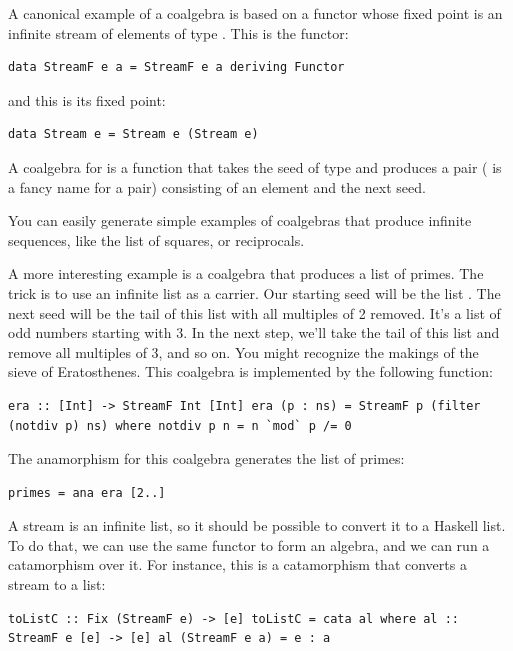 A canonical example of a coalgebra is based on a functor whose fixed
point is an infinite stream of elements of type . This is the
functor:

\begin{verbatim}
data StreamF e a = StreamF e a deriving Functor
\end{verbatim}

and this is its fixed point:

\begin{verbatim}
data Stream e = Stream e (Stream e)
\end{verbatim}

A coalgebra for  is a function that takes the seed of
type  and produces a pair ( is a fancy name
for a pair) consisting of an element and the next seed.

You can easily generate simple examples of coalgebras that produce
infinite sequences, like the list of squares, or reciprocals.

A more interesting example is a coalgebra that produces a list of
primes. The trick is to use an infinite list as a carrier. Our starting
seed will be the list \code{{[}2..{]}}. The next seed will be the tail
of this list with all multiples of 2 removed. It's a list of odd numbers
starting with 3. In the next step, we'll take the tail of this list and
remove all multiples of 3, and so on. You might recognize the makings of
the sieve of Eratosthenes. This coalgebra is implemented by the
following function:

\begin{verbatim}
era :: [Int] -> StreamF Int [Int] era (p : ns) = StreamF p (filter (notdiv p) ns) where notdiv p n = n `mod` p /= 0
\end{verbatim}

The anamorphism for this coalgebra generates the list of primes:

\begin{verbatim}
primes = ana era [2..]
\end{verbatim}

A stream is an infinite list, so it should be possible to convert it to
a Haskell list. To do that, we can use the same functor 
to form an algebra, and we can run a catamorphism over it. For instance,
this is a catamorphism that converts a stream to a list:

\begin{verbatim}
toListC :: Fix (StreamF e) -> [e] toListC = cata al where al :: StreamF e [e] -> [e] al (StreamF e a) = e : a
\end{verbatim}

